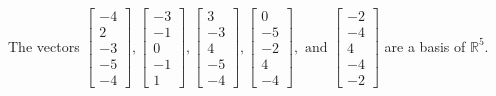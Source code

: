 \begin{exercise}
\begin{exerciseStatement}
  \end{exerciseStatement}
  \begin{exerciseAnswer}
   The vectors \(\left[\begin{array}{r}
-4 \\
2 \\
-3 \\
-5 \\
-4
\end{array}\right] , \left[\begin{array}{r}
-3 \\
-1 \\
0 \\
-1 \\
1
\end{array}\right] , \left[\begin{array}{r}
3 \\
-3 \\
4 \\
-5 \\
-4
\end{array}\right] , \left[\begin{array}{r}
0 \\
-5 \\
-2 \\
4 \\
-4
\end{array}\right] , \text{ and } \left[\begin{array}{r}
-2 \\
-4 \\
4 \\
-4 \\
-2
\end{array}\right]\) 
  	 are  a basis of \(\mathbb{R}^5\).
  


  \end{exerciseAnswer}
\end{exercise}